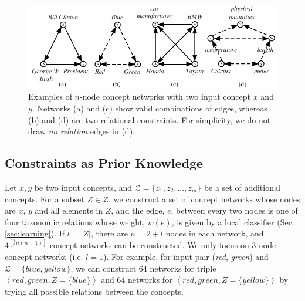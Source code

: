 
\begin{figure}[!t]
  \centering
  \includegraphics[totalheight=0.107\textheight]{networks}
  \caption{Examples of $n$-node concept networks with two
      input concept $x$ and $y$. Networks (a) and (c) show valid
      combinations of edges, whereas (b) and (d) are two relational
      constraints. For simplicity, we do not draw {\em no relation}
      edges in (d).}
  \label{fig:triangles}
\end{figure}

\subsection{Constraints as Prior Knowledge}
\label{sec:cons-prior-know}
Let $x, y$ be two input concepts, and $\mathcal{Z}=\{z_1, z_2, ...,
z_m\}$ be a set of additional concepts. For a subset $Z \in
\mathcal{Z}$, we construct a set of concept networks whose nodes are
$x$, $y$ and all elements in $Z$, and the edge, $e$, between every two
nodes is one of four taxonomic relations whose weight, $w(e)$, is
given by a local classifier (Sec. \ref{sec:learning}). If $l = |Z|$,
there are $n=2+l$ nodes in each network, and $4^{\left [ \frac{1}{2}
    n(n-1) \right ] }$ concept networks can be constructed. We only
focus on 3-node concept networks (i.e. $l = 1$). For example, for
input pair ({\em red}, {\em green}) and $\mathcal{Z} = \{ blue, yellow
\}$, we can construct 64 networks for triple $\left < red, green,
  Z=\{blue\} \right >$ and 64 networks for $\left < red, green,
  Z=\{yellow\} \right >$ by trying all possible relations between the
concepts.

